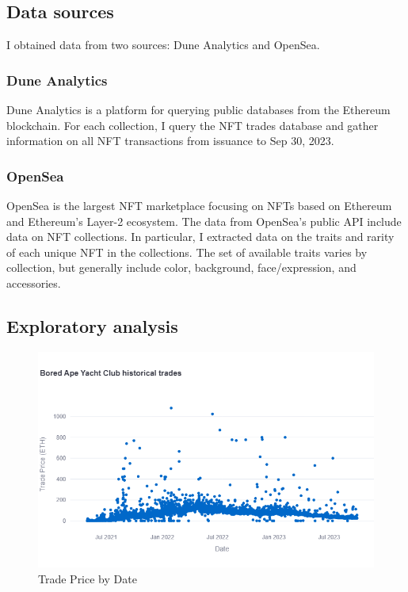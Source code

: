 \documentclass[12pt]{article}
\begin{document}
\subsection{Data sources}
I obtained data from two sources: Dune Analytics and OpenSea.

\subsubsection{Dune Analytics}
Dune Analytics is a platform for querying public databases from the Ethereum blockchain. For each collection, I query the NFT trades database and gather information on all NFT transactions from issuance to Sep 30, 2023.

\subsubsection{OpenSea}
OpenSea is the largest NFT marketplace focusing on NFTs based on Ethereum and Ethereum's Layer-2 ecosystem. The data from OpenSea's public API include data on NFT collections. In particular, I extracted data on the traits and rarity of each unique NFT in the collections. The set of available traits varies by collection, but generally include color, background, face/expression, and accessories.

\subsection{Exploratory analysis}
\begin{figure}[H]
    \includegraphics[width=\textwidth]{../figures/price_date.png}
    \caption{Trade Price by Date}
\end{figure}
\end{document}
